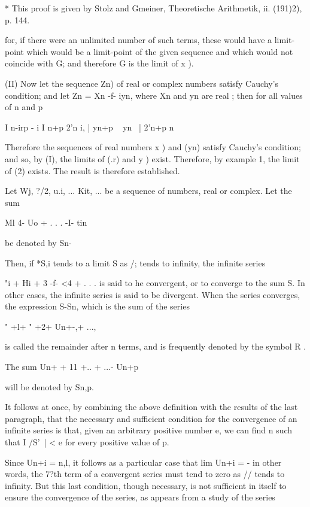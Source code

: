 * This proof is given by Stolz and Gmeiner, Theoretische Arithmetik,
ii. (191)2), p. 144.

%
%

for, if there were an unlimited number of such terms, these would have
a limit-point which would be a limit-point of the given sequence and
which would not coincide with G; and therefore G is the limit of x ).

(II) Now let the sequence Zn) of real or complex numbers satisfy
Cauchy's condition; and let Zn = Xn -f- iyn, where Xn and yn are real
; then for all values of n and p

I n-irp - i I n+p 2'n i, | yn+p ~ yn \ | 2'n+p n\-

Therefore the sequences of real numbers x ) and (yn) satisfy Cauchy's
condition; and so, by (I), the limits of (.r) and y ) exist.
Therefore, by example 1, the limit of (2) exists. The result is
therefore established.


Let Wj, ?/2, u.i, ... Kit, ... be a sequence of numbers, real or
complex. Let the sum

Ml 4- Uo + . . . -I- tin

be denoted by Sn-

Then, if *S,i tends to a limit S as /; tends to infinity, the
infinite series

"i + Hi + 3 -f- <4 + . . . is said to he convergent, or to converge to
the sum S. In other cases, the infinite series is said to be
divergent. When the series converges, the expression S-Sn, which is
the sum of the series

" +l+ " +2+ Un+-,+ ...,

is called the remainder after n terms, and is frequently denoted by
the symbol R .

The sum Un+ + 11 +.. + ...-\- Un+p

will be denoted by Sn,p.

It follows at once, by combining the above definition with the results
of the last paragraph, that the necessary and sufficient condition for
the convergence of an infinite series is that, given an arbitrary
positive number e, we can find n such that I /S'\ | < e for every
positive value of p.

Since Un+i = n,l, it follows as a particular case that lim Un+i = - in
other words, the 7?th term of a convergent series must tend to zero as
// tends to infinity. But this last condition, though necessary, is
not sufficient in itself to ensure the convergence of the series, as
appears from a study of the series

